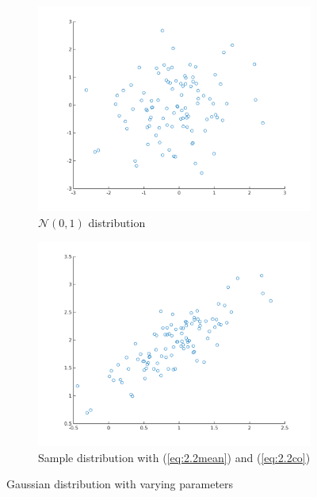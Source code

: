 \documentclass{article}
\begin{document}
\begin{figure}[!ht]
    \centering
    \begin{subfigure}[b]{0.5\textwidth}
        \includegraphics[width=\textwidth]{part1/I221.png}
        \caption{$\mathscr{N}(0,1)$ distribution}
    \end{subfigure}%
    \begin{subfigure}[b]{0.5\textwidth}
        \includegraphics[width=\textwidth]{part1/I222.png}
        \caption{Sample distribution with (\ref{eq:2.2mean}) and (\ref{eq:2.2co})}
    \end{subfigure}
    \caption{Gaussian distribution with varying parameters}
    \label{fig:I2.2}
\end{figure}
\end{document}
